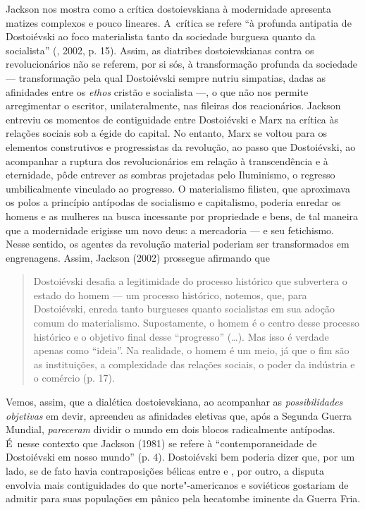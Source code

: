 Jackson nos mostra como a crítica dostoievskiana à modernidade apresenta
matizes complexos e pouco lineares. A~crítica se refere ``à profunda
antipatia de Dostoiévski ao foco materialista tanto da sociedade
burguesa quanto da socialista'' (, 2002, p. 15). Assim, as
diatribes dostoievskianas contra os revolucionários não se referem, por
si sós, à transformação profunda da sociedade --- transformação pela qual
Dostoiévski sempre nutriu simpatias, dadas as afinidades entre os
\emph{ethos} cristão e socialista ---, o que não nos permite arregimentar
o escritor, unilateralmente, nas fileiras dos reacionários. Jackson
entreviu os momentos de contiguidade entre Dostoiévski e Marx na crítica
às relações sociais sob a égide do capital. No entanto, Marx se voltou
para os elementos construtivos e progressistas da revolução, ao passo
que Dostoiévski, ao acompanhar a ruptura dos revolucionários em relação
à transcendência e à eternidade, pôde entrever as sombras projetadas
pelo Iluminismo, o regresso umbilicalmente vinculado ao progresso. O
materialismo filisteu, que aproximava os polos a princípio antípodas de
socialismo e capitalismo, poderia enredar os homens e as mulheres na
busca incessante por propriedade e bens, de tal maneira que a
modernidade erigisse um novo deus: a mercadoria --- e seu fetichismo.
Nesse sentido, os agentes da revolução material poderiam ser
transformados em engrenagens. Assim, Jackson (2002) prossegue afirmando
que

\begin{quote}
Dostoiévski desafia a legitimidade do processo histórico que subvertera
o estado do homem --- um processo histórico, notemos, que, para
Dostoiévski, enreda tanto burgueses quanto socialistas em sua adoção
comum do materialismo. Supostamente, o homem é o centro desse processo
histórico e o objetivo final desse ``progresso'' (\ldots). Mas isso é
verdade apenas como ``ideia''. Na realidade, o homem é um meio, já que o
fim são as instituições, a complexidade das relações sociais, o poder da
indústria e o comércio (p. 17).
\end{quote}

Vemos, assim, que a dialética dostoievskiana, ao acompanhar as
\emph{possibilidades objetivas} em devir, apreendeu as afinidades
eletivas que, após a Segunda Guerra Mundial, \emph{pareceram} dividir o
mundo em dois blocos radicalmente antípodas. É~nesse contexto que
Jackson (1981) se refere à ``contemporaneidade de Dostoiévski em nosso
mundo'' (p. 4). Dostoiévski bem poderia dizer que, por um lado, se de
fato havia contraposições bélicas entre  e , por outro, a disputa
envolvia mais contiguidades do que norte"-americanos e soviéticos
gostariam de admitir para suas populações em pânico pela hecatombe
iminente da Guerra Fria.

